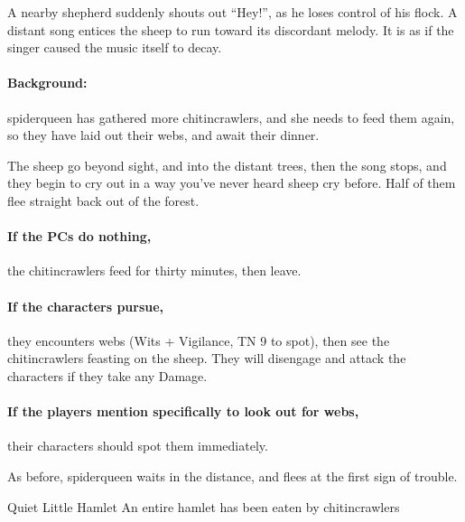 \begin{multicols}{2}
\begin{boxtext}

  A nearby shepherd suddenly shouts out ``Hey!'', as he loses control of his flock.
  A distant song entices the sheep to run toward its discordant melody. It is as if the singer caused the music itself to decay.

\end{boxtext}

\paragraph{Background:}
\Gls{spiderqueen} has gathered more chitincrawlers, and she needs to feed them again, so they have laid out their webs, and await their dinner.

\begin{boxtext}

  The sheep go beyond sight, and into the distant trees, then the song stops, and they begin to cry out in a way you've never heard sheep cry before.  Half of them flee straight back out of the forest.

\end{boxtext}

\paragraph{If the PCs do nothing,}
the chitincrawlers feed for thirty minutes, then leave.

\paragraph{If the characters pursue,}
they encounters webs (Wits + Vigilance, TN 9 to spot), then see the chitincrawlers feasting on the sheep.
They will disengage and attack the characters if they take any Damage.

\paragraph{If the players mention specifically to look out for webs,}
their characters should spot them immediately.

As before, \gls{spiderqueen} waits in the distance, and flees at the first sign of trouble.


{Quiet Little Hamlet}%
{An entire hamlet has been eaten by chitincrawlers}%


\end{multicols}
